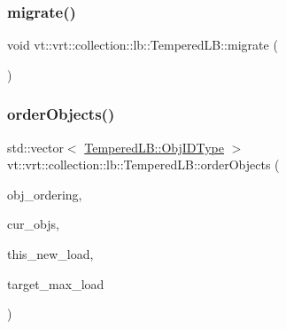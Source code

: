 \mbox{\label{structvt_1_1vrt_1_1collection_1_1lb_1_1_tempered_l_b_a59049101eba58eb9206606c25952bd2d}} 
\subsubsection{\texorpdfstring{migrate()}{migrate()}}
{\footnotesize\ttfamily void vt\+::vrt\+::collection\+::lb\+::\+Tempered\+L\+B\+::migrate (\begin{DoxyParamCaption}{ }\end{DoxyParamCaption})\hspace{0.3cm}{\ttfamily [protected]}}

\mbox{\label{structvt_1_1vrt_1_1collection_1_1lb_1_1_tempered_l_b_a3cb11a0007b4402dc803a9d2d9d23cd9}} 
\subsubsection{\texorpdfstring{order\+Objects()}{orderObjects()}}
{\footnotesize\ttfamily std\+::vector$<$ \hyperlink{structvt_1_1vrt_1_1collection_1_1lb_1_1_base_l_b_a790b22acf448880599724749cdc4e9b3}{Tempered\+L\+B\+::\+Obj\+I\+D\+Type} $>$ vt\+::vrt\+::collection\+::lb\+::\+Tempered\+L\+B\+::order\+Objects (\begin{DoxyParamCaption}\item[{\hyperlink{namespacevt_1_1vrt_1_1collection_1_1lb_a3c71e131f84e2ccbb95f43a1058c749c}{Object\+Order\+Enum}}]{obj\+\_\+ordering,  }\item[{std\+::unordered\+\_\+map$<$ \hyperlink{structvt_1_1vrt_1_1collection_1_1lb_1_1_base_l_b_a790b22acf448880599724749cdc4e9b3}{Obj\+I\+D\+Type}, \hyperlink{namespacevt_a876a9d0cd5a952859c72de8a46881442}{Time\+Type} $>$}]{cur\+\_\+objs,  }\item[{\hyperlink{structvt_1_1vrt_1_1collection_1_1lb_1_1_base_l_b_a215e22b9f12678303f49615ae3be05cc}{Load\+Type}}]{this\+\_\+new\+\_\+load,  }\item[{\hyperlink{namespacevt_a876a9d0cd5a952859c72de8a46881442}{Time\+Type}}]{target\+\_\+max\+\_\+load }\end{DoxyParamCaption})\hspace{0.3cm}{\ttfamily [static]}}

